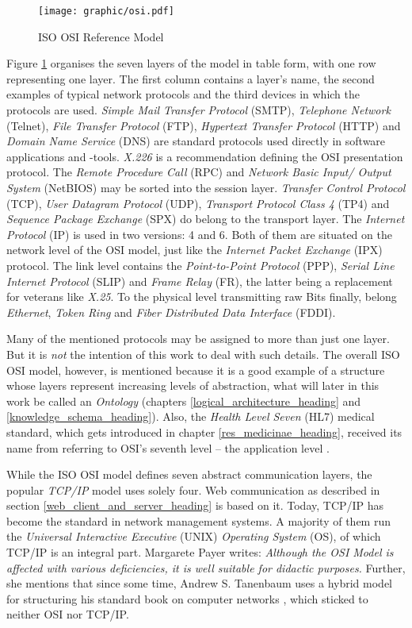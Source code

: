 \begin{figure}[ht]
    \begin{center}
        \texttt{[image: graphic/osi.pdf]}
        \caption{ISO OSI Reference Model}
        \label{osi_figure}
    \end{center}
\end{figure}

Figure \ref{osi_figure} organises the seven layers of the model in table form,
with one row representing one layer. The first column contains a layer's name,
the second examples of typical network protocols and the third devices in which
the protocols are used. \emph{Simple Mail Transfer Protocol} (SMTP),
\emph{Telephone Network} (Telnet), \emph{File Transfer Protocol} (FTP),
\emph{Hypertext Transfer Protocol} (HTTP) and \emph{Domain Name Service} (DNS)
are standard protocols used directly in software applications and -tools.
\emph{X.226} is a recommendation defining the OSI presentation protocol. The
\emph{Remote Procedure Call} (RPC) and \emph{Network Basic Input/ Output System}
(NetBIOS) may be sorted into the session layer. \emph{Transfer Control Protocol}
(TCP), \emph{User Datagram Protocol} (UDP), \emph{Transport Protocol Class 4}
(TP4) and \emph{Sequence Package Exchange} (SPX) do belong to the transport
layer. The \emph{Internet Protocol} (IP) is used in two versions: 4 and 6. Both
of them are situated on the network level of the OSI model, just like the
\emph{Internet Packet Exchange} (IPX) protocol. The link level contains the
\emph{Point-to-Point Protocol} (PPP), \emph{Serial Line Internet Protocol}
(SLIP) and \emph{Frame Relay} (FR), the latter being a replacement for veterans
like \emph{X.25}. To the physical level transmitting raw Bits finally, belong
\emph{Ethernet}, \emph{Token Ring} and \emph{Fiber Distributed Data Interface}
(FDDI).

Many of the mentioned protocols may be assigned to more than just one layer.
But it is \emph{not} the intention of this work to deal with such details. The
overall ISO OSI model, however, is mentioned because it is a good example of a
structure whose layers represent increasing levels of abstraction, what will
later in this work be called an \emph{Ontology} (chapters
\ref{logical_architecture_heading} and \ref{knowledge_schema_heading}). Also,
the \emph{Health Level Seven} (HL7) medical standard, which gets introduced in
chapter \ref{res_medicinae_heading}, received its name from referring to OSI's
seventh level -- the application level \cite{rogers}.

While the ISO OSI model defines seven abstract communication layers, the
popular \emph{TCP/IP} model uses solely four. Web communication as described in
section \ref{web_client_and_server_heading} is based on it. Today, TCP/IP has
become the standard in network management systems. A majority of them run the
\emph{Universal Interactive Executive} (UNIX) \emph{Operating System} (OS), of
which TCP/IP is an integral part. Margarete Payer \cite{payer} writes:
\textit{Although the OSI Model is affected with various deficiencies, it is
well suitable for didactic purposes.} Further, she mentions that since some
time, Andrew S. Tanenbaum uses a hybrid model for structuring his standard book
on computer networks \cite{tanenbaum2000}, which sticked to neither OSI nor
TCP/IP.
